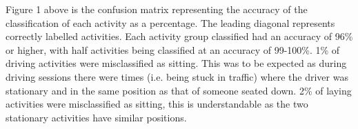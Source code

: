 Figure 1 above is the confusion matrix representing the accuracy of the classification of each activity as a percentage. The leading diagonal represents correctly labelled activities. Each activity group classified had an accuracy of 96\% or higher, with half activities being classified at an accuracy of 99-100\%.
1\% of driving activities were misclassified as sitting. This was to be expected as during driving sessions there were times (i.e. being stuck in traffic) where the driver was stationary and in the same position as that of someone seated down.
2\% of laying activities were misclassified as sitting, this is understandable as the two stationary activities have similar positions.
